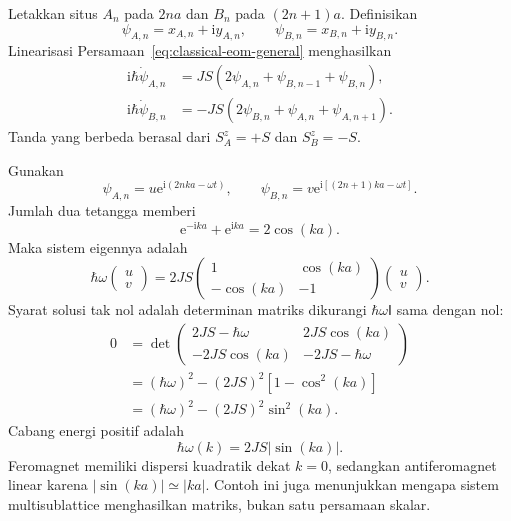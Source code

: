 \documentclass[11pt,a4paper]{article}
\newcommand{\ii}{\mathrm{i}}
\newcommand{\ee}{\mathrm{e}}
\newcommand{\identity}{\mathsf I}
\begin{document}
Letakkan situs $A_n$ pada $2na$ dan $B_n$ pada $(2n+1)a$. Definisikan
\begin{equation}
\psi_{A,n}=x_{A,n}+\ii y_{A,n},
\qquad
\psi_{B,n}=x_{B,n}+\ii y_{B,n}.
\end{equation}
Linearisasi Persamaan~\eqref{eq:classical-eom-general} menghasilkan
\begin{align}
\ii\hbar\dot\psi_{A,n}
&=JS(2\psi_{A,n}+\psi_{B,n-1}+\psi_{B,n}),\\
\ii\hbar\dot\psi_{B,n}
&=-JS(2\psi_{B,n}+\psi_{A,n}+\psi_{A,n+1}).
\end{align}
Tanda yang berbeda berasal dari $S_A^z=+S$ dan $S_B^z=-S$.

Gunakan
\begin{equation}
\psi_{A,n}=u\ee^{\ii(2nka-\omega t)},
\qquad
\psi_{B,n}=v\ee^{\ii[(2n+1)ka-\omega t]}.
\end{equation}
Jumlah dua tetangga memberi
\begin{equation}
\ee^{-\ii ka}+\ee^{\ii ka}=2\cos(ka).
\end{equation}
Maka sistem eigennya adalah
\begin{equation}
\hbar\omega
\begin{pmatrix}u\\v\end{pmatrix}
=2JS
\begin{pmatrix}
1&\cos(ka)\\
-\cos(ka)&-1
\end{pmatrix}
\begin{pmatrix}u\\v\end{pmatrix}.
\end{equation}
Syarat solusi tak nol adalah determinan matriks dikurangi $\hbar\omega\identity$ sama dengan nol:
\begin{align}
0&=\det
\begin{pmatrix}
2JS-\hbar\omega&2JS\cos(ka)\\
-2JS\cos(ka)&-2JS-\hbar\omega
\end{pmatrix}\\
&=(\hbar\omega)^2-(2JS)^2[1-\cos^2(ka)]\\
&=(\hbar\omega)^2-(2JS)^2\sin^2(ka).
\end{align}
Cabang energi positif adalah
\begin{equation}
\boxed{\hbar\omega(k)=2JS|\sin(ka)|.}
\label{eq:af-dispersion}
\end{equation}
Feromagnet memiliki dispersi kuadratik dekat $k=0$, sedangkan antiferomagnet linear karena $|\sin(ka)|\simeq|ka|$. Contoh ini juga menunjukkan mengapa sistem multisublattice menghasilkan matriks, bukan satu persamaan skalar.
\end{document}
